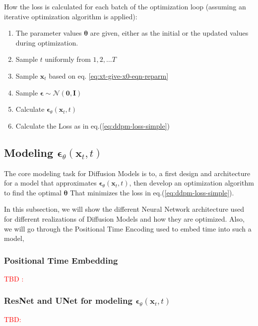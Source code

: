 \documentclass[11pt]{article}
\begin{document}
    How the loss is calculated for each batch of the optimization loop (assuming an iterative optimization algorithm is applied):
    \begin{enumerate}
        \item The parameter values $\bm{\theta}$ are given, either as the initial or the updated values during optimization.
        \item Sample $t$ uniformly from $1,2,\dots T$
        \item Sample $\mathbf{x}_t$ based on eq. \ref{eq:xt-give-x0-eqn-reparm}
        \item Sample $\bm{\epsilon} \sim \mathcal{N}(\mathbf{0},\mathbf{I})$
        \item Calculate $\bm{\epsilon}_{\theta}(\mathbf{x}_t,t)$
        \item Calculate the Loss as in eq.(\ref{eq:ddpm-loss-simple})
    \end{enumerate}
    
    \subsection{Modeling $\bm{\epsilon}_{\theta}(\mathbf{x}_t,t)$}\label{subsec:modeling-ddpm-prametric-noise}
    The core modeling task for Diffusion Models is to, a first design and architecture for a model that approximates
    $\bm{\epsilon}_{\theta}(\mathbf{x}_t,t)$, then develop an optimization algorithm to find the optimal $\bm{\theta}$
    That minimizes the loss in eq.(\ref{eq:ddpm-loss-simple}).

    In this subsection, we will show the different
    Neural Network architecture used for different realizations of Diffusion Models and how they are optimized.
    Also, we will go through the Positional Time Encoding used to embed time into such a model,

    \subsubsection{Positional Time Embedding}
    \textcolor{red}{TBD : \cite{Demystif18:online,AGentleI11:online,vaswani2023attention}}

    \subsubsection{ResNet and UNet for modeling $\bm{\epsilon}_{\theta}(\mathbf{x}_t,t)$}
    \textcolor{red}{TBD: \cite{ho2020denoising,sohldickstein2015deep_diffusion_model_main_paper}}
\end{document}
